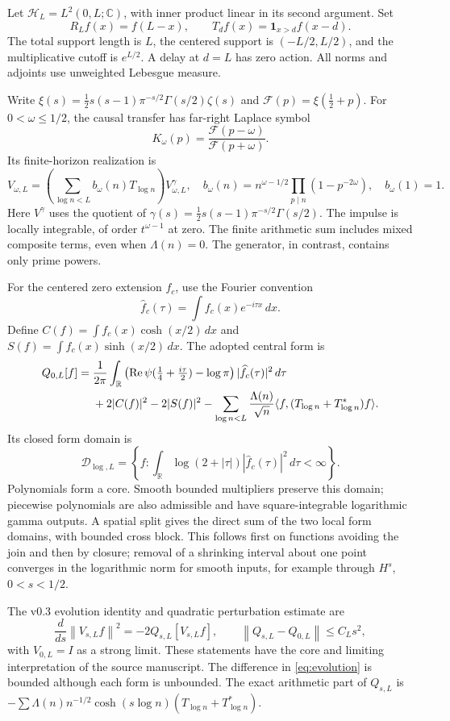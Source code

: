 \documentclass[11pt]{article}
\theoremstyle{remark}\newtheorem{remark}[theorem]{Remark}
\newcommand{\HH}{\mathcal H}
\newcommand{\DD}{\mathcal D}
\newcommand{\Rea}{\operatorname{Re}}
\newcommand{\norm}[1]{\left\|#1\right\|}
\newcommand{\ip}[2]{\langle #1,#2\rangle}
\begin{document}
Let $\HH_L=L^2(0,L;\mathbb C)$, with inner product linear in its second argument. Set
\[
 R_Lf(x)=f(L-x),\qquad T_df(x)=\mathbf1_{x>d}f(x-d).
\]
The total support length is $L$, the centered support is $(-L/2,L/2)$, and the multiplicative cutoff is $e^{L/2}$. A delay at $d=L$ has zero action. All norms and adjoints use unweighted Lebesgue measure.

Write $\xi(s)=\tfrac12s(s-1)\pi^{-s/2}\Gamma(s/2)\zeta(s)$ and $\mathscr F(p)=\xi(\tfrac12+p)$. For $0<\omega\le1/2$, the causal transfer has far-right Laplace symbol
\begin{equation}\label{eq:K}
 K_\omega(p)=\frac{\mathscr F(p-\omega)}{\mathscr F(p+\omega)}.
\end{equation}
Its finite-horizon realization is
\[
 V_{\omega,L}=\left(\sum_{\log n<L}b_\omega(n)T_{\log n}\right)V^\gamma_{\omega,L},
 \quad b_\omega(n)=n^{\omega-1/2}\prod_{p\mid n}(1-p^{-2\omega}),\quad b_\omega(1)=1.
\]
Here $V^\gamma$ uses the quotient of $\gamma(s)=\tfrac12s(s-1)\pi^{-s/2}\Gamma(s/2)$. The impulse is locally integrable, of order $t^{\omega-1}$ at zero. The finite arithmetic sum includes mixed composite terms, even when $\Lambda(n)=0$. The generator, in contrast, contains only prime powers.

For the centered zero extension $f_c$, use the Fourier convention
\[
 \widehat f_c(\tau)=\int f_c(x)e^{-i\tau x}\,dx.
\]
Define $C(f)=\int f_c(x)\cosh(x/2)\,dx$ and
$S(f)=\int f_c(x)\sinh(x/2)\,dx$. The adopted central form is
\begin{align}\label{eq:Q}
 Q_{0,L}[f]={}&\frac1{2\pi}\int_{\mathbb R}
 \left(\Rea\psi(\tfrac14+\tfrac{i\tau}{2})-\log\pi\right)|\widehat f_c(\tau)|^2\,d\tau\notag\\
 &+2|C(f)|^2-2|S(f)|^2
 -\sum_{\log n<L}\frac{\Lambda(n)}{\sqrt n}\ip f{(T_{\log n}+T_{\log n}^*)f}.
\end{align}
Its closed form domain is
\[
 \DD_{\log,L}=\left\{f:\int_{\mathbb R}\log(2+|\tau|)|\widehat f_c(\tau)|^2\,d\tau<\infty\right\}.
\]
Polynomials form a core. Smooth bounded multipliers preserve this domain; piecewise polynomials are also admissible and have square-integrable logarithmic gamma outputs. A spatial split gives the direct sum of the two local form domains, with bounded cross block. This follows first on functions avoiding the join and then by closure; removal of a shrinking interval about one point converges in the logarithmic norm for smooth inputs, for example through $H^s$, $0<s<1/2$.

The v0.3 evolution identity and quadratic perturbation estimate are
\begin{equation}\label{eq:evolution}
 \frac{d}{ds}\norm{V_{s,L}f}^2=-2Q_{s,L}[V_{s,L}f],\qquad
 \norm{Q_{s,L}-Q_{0,L}}\le C_Ls^2,
\end{equation}
with $V_{0,L}=I$ as a strong limit. These statements have the core and limiting interpretation of the source manuscript. The difference in \eqref{eq:evolution} is bounded although each form is unbounded. The exact arithmetic part of $Q_{s,L}$ is
$-\sum\Lambda(n)n^{-1/2}\cosh(s\log n)(T_{\log n}+T_{\log n}^*)$.
\end{document}
